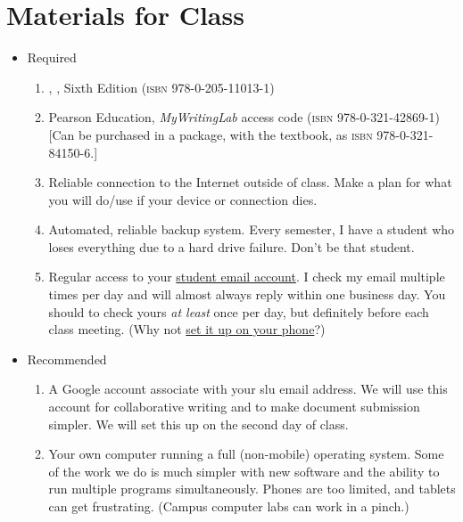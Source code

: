 \documentclass[11pt,oneside]{amsart}	%
\begin{document}
\section{Materials for Class}
\begin{itemize}
	\item Required
		\begin{enumerate}
		\item \citeauthor{biays:2004aa}, , Sixth Edition (\textsc{isbn} 978-0-205-11013-1)
		\item Pearson Education, \emph{MyWritingLab} access code (\textsc{isbn} 978-0-321-42869-1) [Can be purchased in a package, with the textbook, as \textsc{isbn} 978-0-321-84150-6.]
		\item Reliable connection to the Internet outside of class. Make a plan for what you will do/use if your device or connection dies.
		\item Automated, reliable backup system. Every semester, I have a student who loses everything due to a hard drive failure. Don't be that student.
		\item Regular access to your \href{http://outlook.com/saintleo.edu}{student email account}. I check my email multiple times per day and will almost always reply within one business day. You should to check yours \emph{at least} once per day, but definitely before each class meeting. (Why not \href{http://www.saintleo.edu/media/216502/directions_for_setting_up_student_email_access.pdf}{set it up on your phone}?)
	\end{enumerate}
	\item Recommended
	\begin{enumerate}
		\item A Google account associate with your \ac{slu} email address. We will use this account for collaborative writing and to make document submission simpler. We will set this up on the second day of class.
		\item Your own computer running a full (non-mobile) operating system. Some of the work we do is much simpler with new software and the ability to run multiple programs simultaneously. Phones are too limited, and tablets can get frustrating. (Campus computer labs can work in a pinch.)
	\end{enumerate}
\end{itemize}
\end{document}
